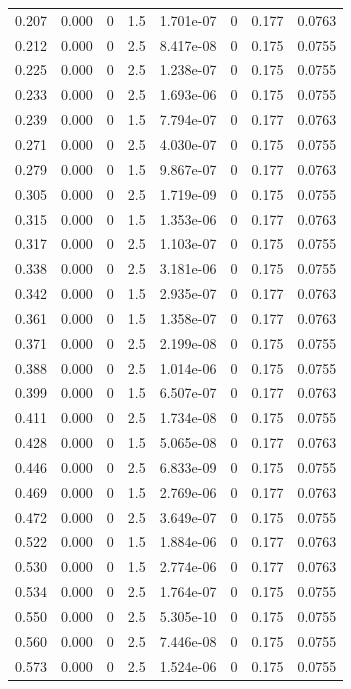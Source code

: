 \documentclass[preview]{standalone}
\begin{document}
{{\begin{tabular}{L{1.2cm}C{1.2cm} C{0.3cm}C{0.5cm} C{1.4cm}C{1.4cm} C{1.4cm}C{1.4cm}}
  0.207  &  0.000  & 0     & 1.5 &  1.701e-07  & 0  & 0.177 &  0.0763   \\ 
  0.212  &  0.000  & 0     & 2.5 &  8.417e-08  & 0  & 0.175 &  0.0755   \\ 
  0.225  &  0.000  & 0     & 2.5 &  1.238e-07  & 0  & 0.175 &  0.0755   \\ 
  0.233  &  0.000  & 0     & 2.5 &  1.693e-06  & 0  & 0.175 &  0.0755   \\ 
  0.239  &  0.000  & 0     & 1.5 &  7.794e-07  & 0  & 0.177 &  0.0763   \\ 
  0.271  &  0.000  & 0     & 2.5 &  4.030e-07  & 0  & 0.175 &  0.0755   \\ 
  0.279  &  0.000  & 0     & 1.5 &  9.867e-07  & 0  & 0.177 &  0.0763   \\ 
  0.305  &  0.000  & 0     & 2.5 &  1.719e-09  & 0  & 0.175 &  0.0755   \\ 
  0.315  &  0.000  & 0     & 1.5 &  1.353e-06  & 0  & 0.177 &  0.0763   \\ 
  0.317  &  0.000  & 0     & 2.5 &  1.103e-07  & 0  & 0.175 &  0.0755   \\ 
  0.338  &  0.000  & 0     & 2.5 &  3.181e-06  & 0  & 0.175 &  0.0755   \\ 
  0.342  &  0.000  & 0     & 1.5 &  2.935e-07  & 0  & 0.177 &  0.0763   \\ 
  0.361  &  0.000  & 0     & 1.5 &  1.358e-07  & 0  & 0.177 &  0.0763   \\ 
  0.371  &  0.000  & 0     & 2.5 &  2.199e-08  & 0  & 0.175 &  0.0755   \\ 
  0.388  &  0.000  & 0     & 2.5 &  1.014e-06  & 0  & 0.175 &  0.0755   \\ 
  0.399  &  0.000  & 0     & 1.5 &  6.507e-07  & 0  & 0.177 &  0.0763   \\ 
  0.411  &  0.000  & 0     & 2.5 &  1.734e-08  & 0  & 0.175 &  0.0755   \\ 
  0.428  &  0.000  & 0     & 1.5 &  5.065e-08  & 0  & 0.177 &  0.0763   \\ 
  0.446  &  0.000  & 0     & 2.5 &  6.833e-09  & 0  & 0.175 &  0.0755   \\ 
  0.469  &  0.000  & 0     & 1.5 &  2.769e-06  & 0  & 0.177 &  0.0763   \\ 
  0.472  &  0.000  & 0     & 2.5 &  3.649e-07  & 0  & 0.175 &  0.0755   \\ 
  0.522  &  0.000  & 0     & 1.5 &  1.884e-06  & 0  & 0.177 &  0.0763   \\ 
  0.530  &  0.000  & 0     & 1.5 &  2.774e-06  & 0  & 0.177 &  0.0763   \\ 
  0.534  &  0.000  & 0     & 2.5 &  1.764e-07  & 0  & 0.175 &  0.0755   \\ 
  0.550  &  0.000  & 0     & 2.5 &  5.305e-10  & 0  & 0.175 &  0.0755   \\ 
  0.560  &  0.000  & 0     & 2.5 &  7.446e-08  & 0  & 0.175 &  0.0755   \\ 
  0.573  &  0.000  & 0     & 2.5 &  1.524e-06  & 0  & 0.175 &  0.0755   \\ 
\hline 
\end{tabular} 

}}
\end{document}
